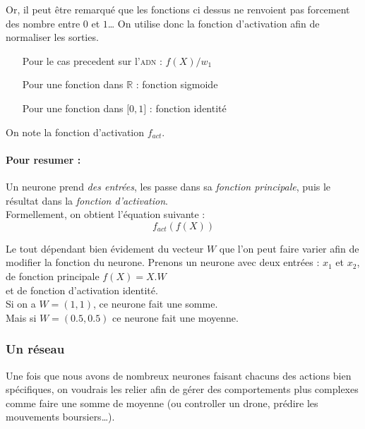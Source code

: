 Or, il peut être remarqué que les fonctions ci dessus ne renvoient pas forcement des nombre entre $0$ et $1$\ldots
On utilise donc la fonction d'activation afin de normaliser les sorties.
\exemle
{
\begin{itemize}
    \item[Pour le cas precedent sur l'\textsc{adn} :] $f(X)/w_1$
    \item[Pour une fonction dans $\mathbb{R}$ :] fonction sigmoide
    \item[Pour une fonction dans $[0, 1 \rbrack$ :] fonction identité
\end{itemize}
}
On note la fonction d'activation $f_{act}$.


\paragraph{Pour resumer :}
Un neurone prend \textit{des entrées},
les passe dans sa \textit{fonction principale},
puis le résultat dans la \textit{fonction d'activation}. \\
Formellement, on obtient l'équation suivante :
\begin{equation}
    f_{act}(f(X))
\end{equation}


Le tout dépendant bien évidement du vecteur $W$ que l'on peut faire varier afin de modifier la fonction du neurone.
\exemle
{
Prenons un neurone avec deux entrées : $x_1$ et $x_2$, \\
de fonction principale $f(X) = X.W$ \\
et de fonction d'activation identité. \\
Si on a $W = (1, 1)$, ce neurone fait une somme.\\
Mais si $W = (0.5, 0.5)$ ce neurone fait une moyenne.
}


\subsubsection{Un réseau}
Une fois que nous avons de nombreux neurones faisant chacuns des actions bien spécifiques,
on voudrais les relier afin de gérer des comportements plus complexes
comme faire une somme de moyenne (ou controller un drone, prédire les mouvements boursiers\ldots).

